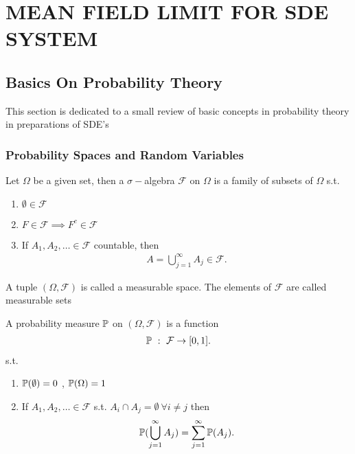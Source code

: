 \chapter{MEAN FIELD LIMIT FOR SDE SYSTEM}
\section{Basics On Probability Theory}
This section is dedicated to a small review of basic concepts 
in probability theory in preparations of SDE's
\subsection{Probability Spaces and Random Variables}
\begin{definition}
 Let $\Omega $  be a given set, then a $\sigma-$algebra $\mathcal{F}$ on $\Omega $ is a
 family of subsets of $\Omega $ s.t.
 \begin{enumerate}
   \item $\emptyset \in  \mathcal{F}$
   \item $F \in  \mathcal{F} \implies F^{c} \in  \mathcal{F} $
   \item If $A_{1},A_{2},\ldots \in \mathcal{F}$ countable, then 
     \begin{align*}
       A = \bigcup_{j=1}^{\infty} A_j \in \mathcal{F}
     .\end{align*}
 \end{enumerate}
\end{definition}
\begin{definition}
 A tuple $(\Omega ,\mathcal{F})$  is called a measurable space. The elements of $\mathcal{F}$ are 
 called measurable sets 
\end{definition}
\begin{definition}
 A probability measure $\P$ on $(\Omega ,\mathcal{F})$  is a function 
 \begin{align*}
   \P \ : \ \mathcal{F} \to [0,1]
 .\end{align*}
 s.t.
 \begin{enumerate}
   \item $\P(\emptyset) = 0$ , $\P(\Omega ) = 1$
   \item If $A_{1},A_{2},\ldots \in \mathcal{F}$ s.t. $A_i \cap A_j = \emptyset \ \forall  i \neq j$  then
     \begin{align*}
       \P(\bigcup_{j=1}^{\infty} A_j ) = \sum_{j=1}^{\infty} \P(A_j) 
     .\end{align*}
 \end{enumerate}
\end{definition}
